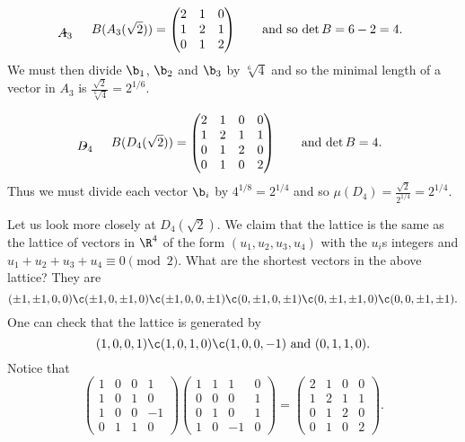 \[ \begin{picture}(2,0)(0,-0.25)\put(0,0){\circle*{0.2}}\put(1,0){\circle*{0.2}}\put(2,0){\circle*{0.2}}\put(0,0){\line(1,0){2}}\put(1,-0.5){\makebox(0,0){$A_3$}}\end{picture} \qquad B(A_3(\sqrt2)) = \begin{pmatrix} 2 & 1 & 0 \\ 1 & 2 & 1 \\ 0 & 1 & 2 \end{pmatrix} \qquad \text{and so $\det B=6-2=4$} . \]%
We must then divide $\b_1$, $\b_2$ and $\b_3$ by $\sqrt[6]4$ and so the minimal length of a vector in $A_3$ is $\frac{\sqrt2}{\sqrt[6]4}=2^{1/6}$.

\[ \begin{picture}(1.707,0)(0,-0.25)\put(0,0){\circle*{0.2}}\put(1,0){\circle*{0.2}}\put(1.707,0.707){\circle*{0.2}}\put(1.707,-0.707){\circle*{0.2}}\put(0,0){\line(1,0){1}}\put(1,0){\line(1,1){0.707}}\put(1,0){\line(1,-1){0.707}}\put(0.854,-0.5){\makebox(0,0){$D_4$}}\end{picture} \qquad B(D_4(\sqrt2)) = \begin{pmatrix} 2 & 1 & 0 & 0 \\ 1 & 2 & 1 & 1 \\ 0 & 1 & 2 & 0 \\ 0 & 1 & 0 & 2 \end{pmatrix} \qquad \text{and $\det B=4$} . \]%
Thus we must divide each vector $\b_i$ by $4^{1/8}=2^{1/4}$ and so $\mu(D_4)=\frac{\sqrt2}{2^{1/4}}=2^{1/4}$.

Let us look more closely at $D_4(\sqrt2)$.  We claim that the lattice is the same as the lattice of vectors in $\R^4$ of the form $(u_1,u_2,u_3,u_4)$ with the $u_i$s integers and $u_1+u_2+u_3+u_4\equiv0\pmod2$.  What are the shortest vectors in the above lattice?  They are
\[ (\pm1,\pm1,0,0)\c  (\pm1,0,\pm1,0)\c  (\pm1,0,0,\pm1)\c  (0,\pm1,0,\pm1)\c  (0,\pm1,\pm1,0)\c  (0,0,\pm1,\pm1) . \]
One can check that the lattice is generated by
\[ (1,0,0,1)\c  (1,0,1,0)\c  (1,0,0,-1) \text{ and } (0,1,1,0) . \]
Notice that
\[ \begin{pmatrix} 1 & 0 & 0 & 1 \\ 1 & 0 & 1 & 0 \\ 1 & 0 & 0 & -1 \\ 0 & 1 & 1 & 0 \end{pmatrix}
\begin{pmatrix} 1 & 1 & 1 & 0 \\ 0 & 0 & 0 & 1 \\ 0 & 1 & 0 & 1 \\ 1 & 0 & -1 & 0 \end{pmatrix}
=
\begin{pmatrix} 2 & 1 & 0 & 0 \\ 1 & 2 & 1 & 1 \\ 0 & 1 & 2 & 0 \\ 0 & 1 & 0 & 2 \end{pmatrix} . \]

